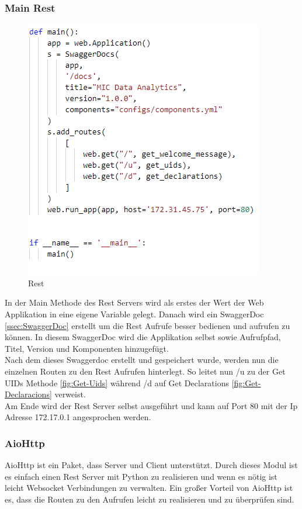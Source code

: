 \subsubsection{Main Rest}
\begin{figure}[H]
\centering
  \includegraphics[scale=0.6]{images/MainRest.PNG}
  \caption[Rest]{Rest}
  \label{fig:Rest}
\end{figure}
In der Main Methode des Rest Servers wird als erstes der Wert der Web Applikation in eine eigene Variable gelegt. Danach wird ein SwaggerDoc \ref{ssec:SwaggerDoc} erstellt um die Rest Aufrufe besser bedienen und aufrufen zu können. In diesem SwaggerDoc wird die Applikation selbst sowie Aufrufpfad, Titel, Version und Komponenten hinzugefügt.\\

Nach dem dieses Swaggerdoc erstellt und gespeichert wurde, werden nun die einzelnen Routen zu den Rest Aufrufen hinterlegt. So leitet nun /u zu der Get UIDs Methode \ref{fig:Get-Uids} während /d auf Get Declarations \ref{fig:Get-Declaracions} verweist.\\

Am Ende wird der Rest Server selbst ausgeführt und kann auf Port 80 mit der Ip Adresse 172.17.0.1 angesprochen werden.
\subsubsection{AioHttp}
AioHttp ist ein Paket, dass Server und Client unterstützt. Durch dieses Modul ist es einfach einen Rest Server mit Python zu realisieren und wenn es nötig ist leicht Websocket Verbindungen zu verwalten. Ein großer Vorteil von AioHttp ist es, dass die Routen zu den Aufrufen leicht zu realisieren und zu überprüfen sind. 
